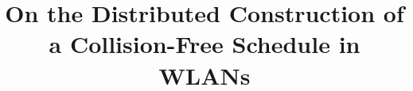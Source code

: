 \documentclass[journal]{IEEEtran}
\begin{document}
%
\title{On the Distributed Construction of a Collision-Free Schedule in WLANs}
%
%
%

\author{
}


% 
%
\end{document}
